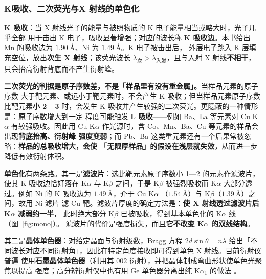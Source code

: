 \subsubsection{K吸收、二次荧光与X 射线的单色化}

\textbf{K 吸收}：当 X 射线光子的能量与被照物质的 K 电子能量相当或略大时，光子几乎全部
用于击出 K 电子，吸收显著增强；对应的波长称 \textbf{K 吸收边}。本书给出
Mn 的吸收边为 $\qty{1.90}{\angstrom}$、Ni 为 $\qty{1.49}{\angstrom}$。K 电子被击出后，
外层电子跳入 K 层填充空位，放出\textbf{次生 X 射线}；该荧光波长 $\lambda_{\text{次}}>
\lambda_{\text{入射}}$，且与入射 X 射线\textbf{不相干}，只会抬高衍射背底而不产生衍射峰。

\begin{pitfall}
\textbf{二次荧光的判据是原子序数差，不是「样品里有没有重金属」。}当样品元素的原子序数
大于靶元素、或远小于靶元素时，不会产生 K 吸收；但当样品元素原子序数比靶元素\textbf{小
2—3} 时，会发生 K 吸收并产生较强的二次荧光。更隐蔽的一种情形是：原子序数增大到一定
程度可能触发 \textbf{L 吸收}——例如 Ba、La 等元素对 Cu K$\alpha$ 有较强吸收。因此用
Cu K$\alpha$ 作光源时，含 Co、Mn、Ba、Cu 等元素的样品会出现\textbf{背底抬高、衍射峰
强度变弱}；而 Pb、Ba 这类重元素还有一个后果常被忽略：\textbf{样品的总吸收增大，会使
「无限厚样品」的假设在浅层就失效}，从而进一步降低有效衍射体积。
\end{pitfall}

\textbf{单色化}有两条路。其一是\textbf{滤波片}：选比靶元素原子序数小 1—2 的元素作滤波片，
使其 K 吸收边恰好落在 K$\alpha$ 与 K$\beta$ 之间，于是 K$\beta$ 被强烈吸收而 K$\alpha$
大部分透过。例如 Ni 的 K 吸收边为 $\qty{1.49}{\angstrom}$，介于 Cu K$\alpha$
（$\qty{1.54}{\angstrom}$）与 K$\beta$（$\qty{1.39}{\angstrom}$）之间，故用 Ni 滤片
滤 Cu 靶。滤波片厚度的确定方法是：\textbf{使 X 射线透过滤波片后 K$\alpha$ 减弱约一半}，
此时绝大部分 K$\beta$ 已被吸收，得到基本单色化的 K$\alpha$ 线（图~\ref{fig:mono}）。
滤波片的代价是强度损失，而且\textbf{它不改变 K$\alpha$ 的双线结构}。

其二是\textbf{晶体单色器}：对给定晶面与衍射级数，Bragg 方程 $2d\sin\theta=n\lambda$
给出「不同波长对应不同衍射角」，因此在特定角度接收即可得到单色 X 射线。目前衍射仪普遍
使用\textbf{石墨晶体单色器}（利用其 $002$ 衍射），并把晶体制成弯曲形状使单色光聚焦以提高
强度；高分辨衍射仪中也有用 Ge 单色器分离出纯 K$\alpha_1$ 的做法
。


